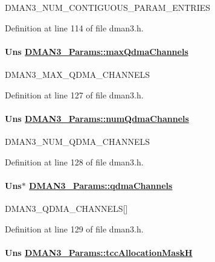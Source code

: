 DMAN3\_\-NUM\_\-CONTIGUOUS\_\-PARAM\_\-ENTRIES 

Definition at line 114 of file dman3.h.\hypertarget{struct_d_m_a_n3___params_c8625cdf0b069aea5d9456be100aef33}{
\paragraph[maxQdmaChannels]{\setlength{\rightskip}{0pt plus 5cm}Uns \hyperlink{struct_d_m_a_n3___params_c8625cdf0b069aea5d9456be100aef33}{DMAN3\_\-Params::max\-Qdma\-Channels}}\hfill}
\label{struct_d_m_a_n3___params_c8625cdf0b069aea5d9456be100aef33}


DMAN3\_\-MAX\_\-QDMA\_\-CHANNELS 

Definition at line 127 of file dman3.h.\hypertarget{struct_d_m_a_n3___params_354db3352d61cd71924bdd6c8827f5a5}{
\paragraph[numQdmaChannels]{\setlength{\rightskip}{0pt plus 5cm}Uns \hyperlink{struct_d_m_a_n3___params_354db3352d61cd71924bdd6c8827f5a5}{DMAN3\_\-Params::num\-Qdma\-Channels}}\hfill}
\label{struct_d_m_a_n3___params_354db3352d61cd71924bdd6c8827f5a5}


DMAN3\_\-NUM\_\-QDMA\_\-CHANNELS 

Definition at line 128 of file dman3.h.\hypertarget{struct_d_m_a_n3___params_3ce746095fcc42779b01362ba9fe2359}{
\paragraph[qdmaChannels]{\setlength{\rightskip}{0pt plus 5cm}Uns$\ast$ \hyperlink{struct_d_m_a_n3___params_3ce746095fcc42779b01362ba9fe2359}{DMAN3\_\-Params::qdma\-Channels}}\hfill}
\label{struct_d_m_a_n3___params_3ce746095fcc42779b01362ba9fe2359}


DMAN3\_\-QDMA\_\-CHANNELS\mbox{[}\mbox{]} 

Definition at line 129 of file dman3.h.\hypertarget{struct_d_m_a_n3___params_1866abe117288a1d94b9ac62039b7f46}{
\paragraph[tccAllocationMaskH]{\setlength{\rightskip}{0pt plus 5cm}Uns \hyperlink{struct_d_m_a_n3___params_1866abe117288a1d94b9ac62039b7f46}{DMAN3\_\-Params::tcc\-Allocation\-Mask\-H}}\hfill}
\label{struct_d_m_a_n3___params_1866abe117288a1d94b9ac62039b7f46}


